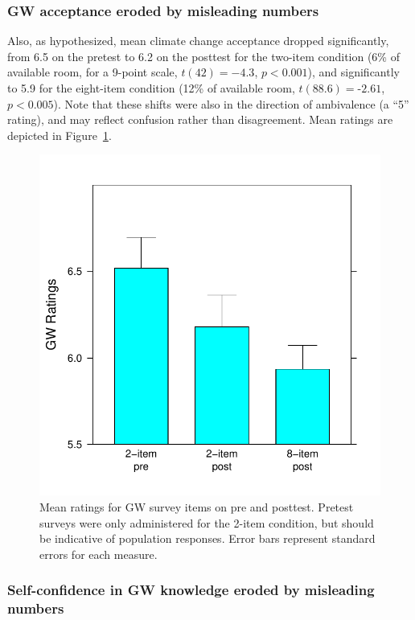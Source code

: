 \subsubsection{GW acceptance eroded by misleading numbers}

Also, as hypothesized, mean climate change acceptance dropped significantly,
from 6.5 on the pretest to 6.2 on the posttest for the two-item condition (6\%
of available room, for a 9-point scale, $t(42)=-4.3$, $p<0.001$), and
significantly to 5.9 for the eight-item condition (12\% of available room,
$t(88.6)=‑2.61$, $p<0.005$).  Note that these shifts were also in the direction
of ambivalence (a ``5'' rating), and may reflect confusion rather than
disagreement. Mean ratings are depicted in Figure~\ref{fig:evil-GW}.

\begin{figure}
    \centering
    \includegraphics{evil-GW.pdf}
    \caption{Mean ratings for GW survey items on pre and posttest. Pretest
        surveys were only administered for the 2-item condition, but should be
        indicative of population responses. Error bars represent standard errors
        for each measure.}
    \label{fig:evil-GW}
\end{figure}

\subsubsection{Self-confidence in GW knowledge eroded by misleading numbers}

